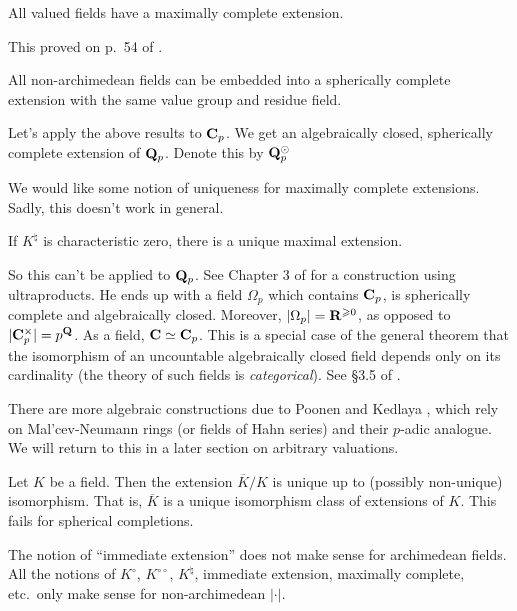 \begin{theorem}[Krull]
All valued fields have a maximally complete extension. 
\end{theorem}

This proved on p.~54 of \cite{narici-beckenstein-bachman}. 

\begin{theorem}
All non-archimedean fields can be embedded into a spherically complete 
extension with the same value group and residue field. 
\end{theorem}

\begin{example}
Let's apply the above results to $\mathbf{C}_p$. We get an algebraically closed, 
spherically complete extension of $\mathbf{Q}_p$. Denote this by $\mathbf{Q}_p^\odot$
\end{example}

We would like some notion of uniqueness for maximally complete extensions. 
Sadly, this doesn't work in general. 

\begin{theorem}[Kaplansky]
If $K^\natural$ is characteristic zero, there is a unique maximal extension. 
\end{theorem}

So this can't be applied to $\mathbf{Q}_p$. See Chapter 3 of \cite{robert-2000} for 
a construction using ultraproducts. He ends up with a field $\Omega_p$ which 
contains $\mathbf{C}_p$, is spherically complete and algebraically closed. Moreover, 
$|\Omega_p|=\mathbf{R}^{\geqslant 0}$, as opposed to $|\mathbf{C}_p^\times|=p^{\mathbf{Q}}$. As a 
field, $\mathbf{C}\simeq \mathbf{C}_p$. This is a special case of the general theorem that 
the isomorphism of an uncountable algebraically closed field depends only on 
its cardinality (the theory of such fields is \emph{categorical}). See 
\S 3.5 of \cite{robert-2000}. 

There are more algebraic constructions due to Poonen \cite{poonen-1993} and 
Kedlaya \cite{kedlaya-2001}, which rely on Mal'cev-Neumann rings (or fields of 
Hahn series) and their $p$-adic analogue. We will return to this in a later 
section on arbitrary valuations. 

Let $K$ be a field. Then the extension $\overline K/K$ is unique up to 
(possibly non-unique) isomorphism. That is, $\overline K$ is a unique 
isomorphism class of extensions of $K$. 
This fails for spherical completions. 

The notion of ``immediate extension'' does not make sense for archimedean 
fields. All the notions of $K^\circ$, $K^{\circ\circ}$, $K^\natural$, 
immediate extension, maximally complete, etc.~only make sense for non-archimedean 
$|\cdot|$. 

